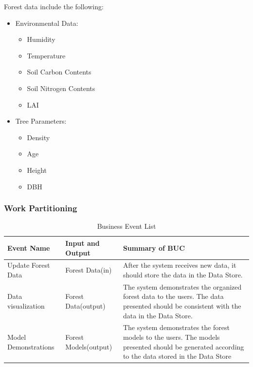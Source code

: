 \documentclass{article}
\begin{document}
\noindent Forest data include the following:
\begin{itemize}
\item Environmental Data:
\begin{itemize}
    \item Humidity
    \item Temperature
    \item Soil Carbon Contents
    \item Soil Nitrogen Contents
    \item LAI
\end{itemize}
\item Tree Parameters:
\begin{itemize}
    \item Density
    \item Age
    \item Height
    \item DBH
\end{itemize}
\end{itemize}

\subsubsection{Work Partitioning}
\begin{table}[H]
\caption{Business Event List} 
\begin{tabularx}{\textwidth}{XXX}
\toprule
\textbf{Event Name} & \textbf{Input and Output} & \textbf{Summary of BUC}\\
\midrule
Update Forest Data & Forest Data(in) & After the system receives new data, it 
should store the data in the Data Store.\\
\hline
Data visualization & Forest Data(output) & The system demonstrates the organized 
forest data to the users. The data presented should be consistent with 
the data in the Data Store.\\
\hline
Model Demonstrations & Forest Models(output) & The system demonstrates the 
forest models to the users. The models presented should be generated according 
to the data stored in the Data Store\\
\bottomrule
\end{tabularx}
\end{table}

\newpage
\end{document}

